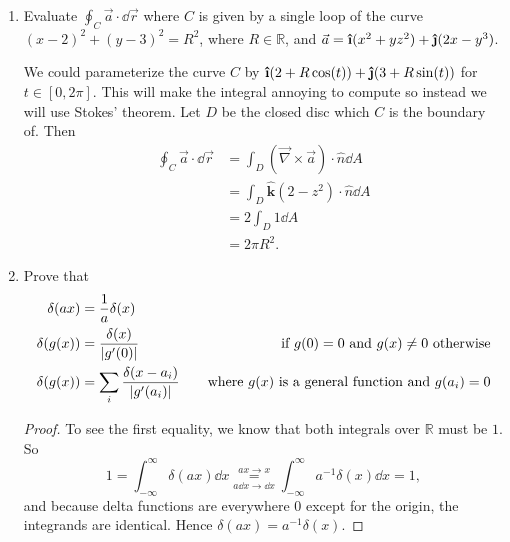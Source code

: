 \documentclass[11pt]{article}
\newcommand{\ihat}{\boldsymbol{\hat{\textbf{\i}}}}
\newcommand{\jhat}{\boldsymbol{\hat{\textbf{\j}}}}
\newcommand{\khat}{\boldsymbol{\hat{\textbf{k}}}}
\begin{document}
\begin{enumerate}%
    \item Evaluate $\oint_C \vec{a}\cdot \dd{\vec{r}}$ where $C$ is given by a single loop of the curve $(x-2)^2 + (y-3)^2 = R^2$, where $R\in\mathbb{R}$, and $\vec{a} = \ihat (x^2+yz^2) + \jhat (2x-y^3)$.
    
    We could parameterize the curve $C$ by $\ihat (2+R\cos(t)) + \jhat (3+R\sin(t))$ for $t\in[0,2\pi]$. This will make the integral annoying to compute so instead we will use Stokes' theorem. Let $D$ be the closed disc which $C$ is the boundary of. Then 
    \begin{align*}
        \oint_C \vec{a}\cdot\dd{\vec{r}} &= \int_D (\vec{\nabla}\times \vec{a} )\cdot \hat{n} \dd{A}\\
        &= \int_D \khat \left(2-z^2\right)\cdot \hat{n} \dd{A} \\
        &= 2\int_D 1 \dd{A}\\
        &= 2\pi R^2.
    \end{align*}
    \item Prove that \begin{align*}
        \delta(ax) &= \frac{1}{a}\delta(x) & \\
        \delta(g(x)) &= \frac{\delta(x)}{\abs{g^{\prime}(0)}} &\quad \text{if $g(0) = 0$ and $g(x) \neq 0$ otherwise}\\
        \delta(g(x)) &= \sum_i \frac{\delta(x-a_i)}{\abs{g^{\prime}(a_i)}} &\quad \text{where $g(x)$ is a general function and $g(a_i) = 0$}
    \end{align*}
    \begin{proof}
        To see the first equality, we know that both integrals over $\mathbb{R}$ must be $1$. So 
        \[1 = \int_{-\infty}^{\infty}\delta(ax)\dd{x} \underset{a\dd{x} \to \dd{x}}{\overset{ax\to x}{=}} \int_{-\infty}^{\infty}a^{-1}\delta(x)\dd{x} = 1,\] and because delta functions are everywhere $0$ except for the origin, the integrands are identical. Hence $\delta(ax) =a^{-1}\delta(x)$.


\end{proof}
\end{enumerate}
\end{document}

